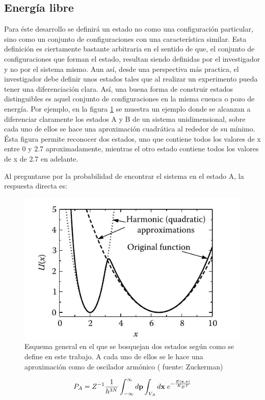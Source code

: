 \documentclass [11pt]{article}
\begin{document}
\subsection{Energía libre}

Para éste desarrollo se definirá un estado no como una configuración particular, sino como un conjunto de configuraciones con una característica similar. Esta definición es ciertamente bastante arbitraria en el sentido de que, el conjunto de configuraciones que forman el estado, resultan siendo definidas por el investigador y no por el sistema mismo. Aun así, desde una perspectiva más practica, el investigador debe definir unos estados tales que al realizar un experimento pueda tener una diferenciación clara. Así, una buena forma de construir estados distinguibles es aquel conjunto de configuraciones en la misma cuenca o pozo de energía. Por ejemplo, en la figura \ref{estados} se muestra un ejemplo donde se alcanzan a diferenciar claramente los estados A y B de un sistema unidimensional, sobre cada uno de ellos se hace una aproximación cuadrática al rededor de su mínimo. Ésta figura permite reconocer dos estados, uno que contiene todos los valores de x entre 0 y 2.7 aproximadamente, mientras el otro estado contiene todos los valores de x de 2.7 en adelante. 

Al preguntarse por la probabilidad de encontrar el sistema en el estado A, la respuesta directa es:

\begin{figure}[t]
\centering
\includegraphics[width=0.7\linewidth]{estados}
\caption{Esquema general en el que se bosquejan dos estados según como se define en este trabajo. A cada uno de ellos se le hace una aproximación como de oscilador armónico ({\color{red} fuente: Zuckerman})}
\label{estados}
\end{figure}

 
 
 \begin{equation}
     P_A=Z^{-1} \frac{1}{h^{3N}} \int_{-\infty}^{\infty}d{\bf p}\int_{V_A}d{\bf x}{\hspace{0.1 cm}}e^{-\frac{E({\bf x},{\bf v})}{K_BT}}
 \end{equation}
 
\end{document}
